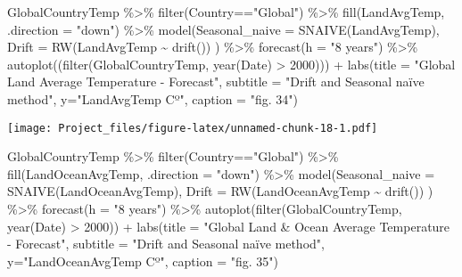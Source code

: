 \documentclass[
]{article}
\newenvironment{Shaded}{\begin{snugshade}}{\end{snugshade}}
\newcommand{\AttributeTok}[1]{\textcolor[rgb]{0.77,0.63,0.00}{#1}}
\newcommand{\DecValTok}[1]{\textcolor[rgb]{0.00,0.00,0.81}{#1}}
\newcommand{\FunctionTok}[1]{\textcolor[rgb]{0.00,0.00,0.00}{#1}}
\newcommand{\NormalTok}[1]{#1}
\newcommand{\SpecialCharTok}[1]{\textcolor[rgb]{0.00,0.00,0.00}{#1}}
\newcommand{\StringTok}[1]{\textcolor[rgb]{0.31,0.60,0.02}{#1}}
\begin{document}
\begin{Shaded}
\begin{Highlighting}[]
\NormalTok{GlobalCountryTemp }\SpecialCharTok{\%\textgreater{}\%} 
  \FunctionTok{filter}\NormalTok{(Country}\SpecialCharTok{==}\StringTok{"Global"}\NormalTok{) }\SpecialCharTok{\%\textgreater{}\%} 
  \FunctionTok{fill}\NormalTok{(LandAvgTemp, }\AttributeTok{.direction =} \StringTok{"down"}\NormalTok{) }\SpecialCharTok{\%\textgreater{}\%} 
  \FunctionTok{model}\NormalTok{(}\AttributeTok{Seasonal\_naive =} \FunctionTok{SNAIVE}\NormalTok{(LandAvgTemp),}
        \AttributeTok{Drift =} \FunctionTok{RW}\NormalTok{(LandAvgTemp }\SpecialCharTok{\textasciitilde{}} \FunctionTok{drift}\NormalTok{())}
\NormalTok{        ) }\SpecialCharTok{\%\textgreater{}\%} \FunctionTok{forecast}\NormalTok{(}\AttributeTok{h =} \StringTok{"8 years"}\NormalTok{) }\SpecialCharTok{\%\textgreater{}\%} 
  \FunctionTok{autoplot}\NormalTok{((}\FunctionTok{filter}\NormalTok{(GlobalCountryTemp, }\FunctionTok{year}\NormalTok{(Date) }\SpecialCharTok{\textgreater{}} \DecValTok{2000}\NormalTok{))) }\SpecialCharTok{+} 
  \FunctionTok{labs}\NormalTok{(}\AttributeTok{title =} \StringTok{"Global Land Average Temperature {-} Forecast"}\NormalTok{,}
       \AttributeTok{subtitle =} \StringTok{"Drift and Seasonal naïve method"}\NormalTok{,}
       \AttributeTok{y=}\StringTok{"LandAvgTemp Cº"}\NormalTok{,}
       \AttributeTok{caption =} \StringTok{"fig. 34"}\NormalTok{)}
\end{Highlighting}
\end{Shaded}

\texttt{[image: Project\_files/figure-latex/unnamed-chunk-18-1.pdf]}

\begin{Shaded}
\begin{Highlighting}[]
\NormalTok{GlobalCountryTemp }\SpecialCharTok{\%\textgreater{}\%} 
  \FunctionTok{filter}\NormalTok{(Country}\SpecialCharTok{==}\StringTok{"Global"}\NormalTok{) }\SpecialCharTok{\%\textgreater{}\%} 
  \FunctionTok{fill}\NormalTok{(LandOceanAvgTemp, }\AttributeTok{.direction =} \StringTok{"down"}\NormalTok{) }\SpecialCharTok{\%\textgreater{}\%} 
  \FunctionTok{model}\NormalTok{(}\AttributeTok{Seasonal\_naive =} \FunctionTok{SNAIVE}\NormalTok{(LandOceanAvgTemp),}
        \AttributeTok{Drift =} \FunctionTok{RW}\NormalTok{(LandOceanAvgTemp }\SpecialCharTok{\textasciitilde{}} \FunctionTok{drift}\NormalTok{())}
\NormalTok{        ) }\SpecialCharTok{\%\textgreater{}\%} \FunctionTok{forecast}\NormalTok{(}\AttributeTok{h =} \StringTok{"8 years"}\NormalTok{) }\SpecialCharTok{\%\textgreater{}\%} 
  \FunctionTok{autoplot}\NormalTok{(}\FunctionTok{filter}\NormalTok{(GlobalCountryTemp, }\FunctionTok{year}\NormalTok{(Date) }\SpecialCharTok{\textgreater{}} \DecValTok{2000}\NormalTok{)) }\SpecialCharTok{+}
  \FunctionTok{labs}\NormalTok{(}\AttributeTok{title =} \StringTok{"Global Land \& Ocean Average Temperature {-} Forecast"}\NormalTok{,}
       \AttributeTok{subtitle =} \StringTok{"Drift and Seasonal naïve method"}\NormalTok{,}
       \AttributeTok{y=}\StringTok{"LandOceanAvgTemp Cº"}\NormalTok{,}
       \AttributeTok{caption =} \StringTok{"fig. 35"}\NormalTok{)}
\end{Highlighting}
\end{Shaded}
\end{document}
